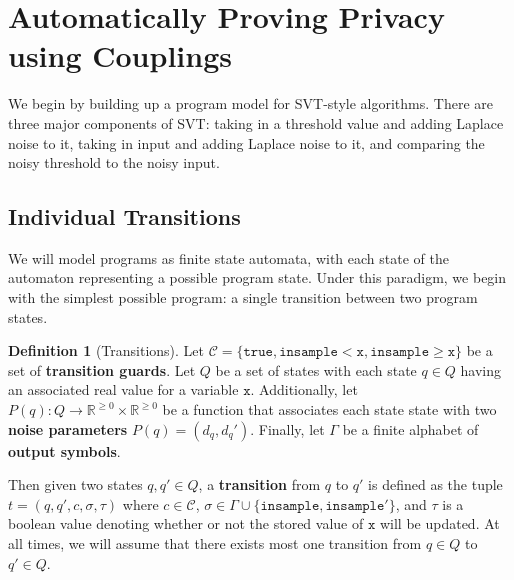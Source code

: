 \documentclass[12pt]{article}
\newcommand{\RR}{\mathbb{R}}
\newcommand{\gguard}[1][x]{\texttt{insample}\geq #1}
\newcommand{\lguard}[1][x]{\texttt{insample} < #1}
\theoremstyle{definition}
\newtheorem{defn}[thm]{Definition}
\begin{document}
\section{Automatically Proving Privacy using Couplings}

We begin by building up a program model for SVT-style algorithms. There are three major components of SVT: taking in a threshold value and adding Laplace noise to it, taking in input and adding Laplace noise to it, and comparing the noisy threshold to the noisy input. 

\subsection{Individual Transitions}
We will model programs as finite state automata, with each state of the automaton representing a possible program state. Under this paradigm, we begin with the simplest possible program: a single transition between two program states. 

\begin{defn}[Transitions]
    Let $\mathcal{C}=\{\texttt{true}, \lguard[\texttt{x}], \gguard[\texttt{x}]\}$ be a set of \textbf{transition guards}. Let $Q$ be a set of states with each state $q\in Q$ having an associated real value for a variable $\texttt{x}$. Additionally, let $P(q): Q\to \RR^{\geq 0}\times \RR^{\geq 0}$ be a function that associates each state state with two \textbf{noise parameters} $P(q) = (d_q, d_q')$. Finally, let $\Gamma$ be a finite alphabet of \textbf{output symbols}. 

    Then given two states $q, q'\in Q$, a \textbf{transition} from $q$ to $q'$ is defined as the tuple $t = (q, q', c, \sigma,\tau)$ where $c\in \mathcal{C}$, $\sigma\in \Gamma\cup\{\texttt{insample}, \texttt{insample}'\}$, and $\tau$ is a boolean value denoting whether or not the stored value of $\texttt{x}$ will be updated. At all times, we will assume that there exists most one transition from $q\in Q$ to $q'\in Q$. 
\end{defn}
\end{document}
